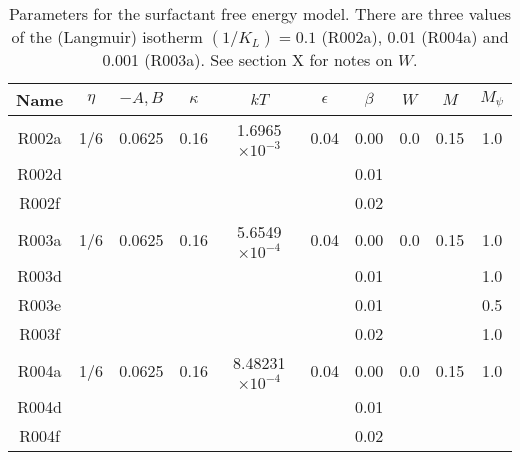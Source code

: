 \begin{table}[h]
\begin{center}
\begin{tabular}{|c|c|c|c|c|c|c|c|c|c|}
\hline
Name & $\eta$ & $-A,B$ & $\kappa$ & $kT$ & $\epsilon$ & $\beta$ & $W$
     & $M$ & $M_\psi$\\
\hline
R002a & 1/6 & 0.0625 & 0.16 & 1.6965$\times 10^{-3}$ & 0.04 & 0.00 & 0.0 
      & 0.15 & 1.0 \\
R002d &  &  &  & & & 0.01 &  &  &  \\
R002f &  &  &  & & & 0.02 &  &  &  \\
\hline
R003a & 1/6 & 0.0625 & 0.16 & 5.6549$\times 10^{-4}$ & 0.04 & 0.00 & 0.0 
      & 0.15 & 1.0 \\

R003d & &  & &  &  & 0.01 &  &  & 1.0\\
R003e & &  & &  &  & 0.01 &  &  & 0.5\\
R003f & &  & &  &  & 0.02 &  &  & 1.0\\
\hline
R004a & 1/6 & 0.0625 & 0.16 & 8.48231$\times 10^{-4}$ & 0.04 & 0.00 & 0.0 
      & 0.15 & 1.0 \\
R004d & &  &  &  & & 0.01 &  &  &  \\
R004f & &  &  &  & & 0.02 &  &  &  \\

\hline
\end{tabular}
\caption{Parameters for the surfactant free energy model. There are
three values of the (Langmuir) isotherm $(1/K_L) = 0.1$ (R002a),
0.01 (R004a) and 0.001 (R003a).
See section X for notes on $W$.}
\end{center}
\end{table}


